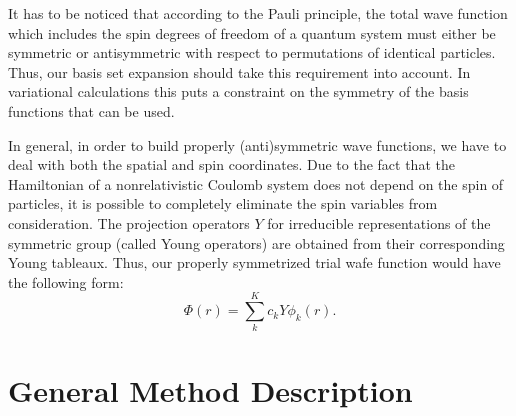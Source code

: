 It has to be noticed that according to the Pauli principle, the total wave function
which includes the spin degrees of freedom of a quantum system must either be symmetric 
or antisymmetric with respect to permutations of identical particles. 
Thus, our basis set expansion should take this requirement into account. 
In variational calculations this puts a constraint on the symmetry of the basis 
functions that can be used. 

In general, in order to build properly (anti)symmetric wave functions, we have to deal 
with both the spatial and spin coordinates. Due to the fact that the Hamiltonian of a
nonrelativistic Coulomb system does not depend on the spin of particles, it is possible 
to completely eliminate the spin variables from consideration. The projection operators
$Y$ for irreducible representations of the symmetric group (called Young operators) are 
obtained from their corresponding Young tableaux. Thus, our properly symmetrized 
trial wafe function would have the following form:
\begin{equation}
\Phi (r) = \sum_k^{K} c_k Y \phi_k(r).
\label{wf_perm}
\end{equation}



\section{General Method Description}









